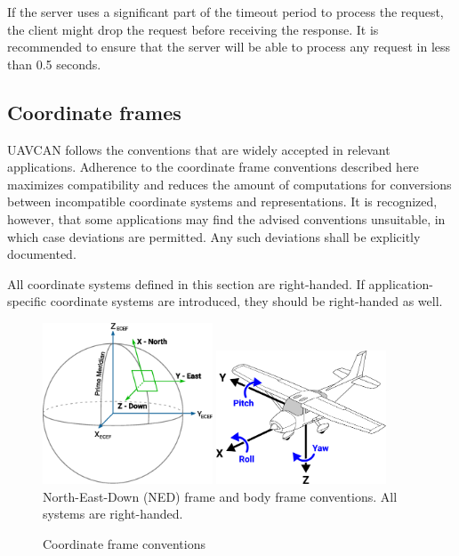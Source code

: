 If the server uses a significant part of the timeout period to process the request,
the client might drop the request before receiving the response.
It is recommended to ensure that the server will be able to process any request in less than 0.5 seconds.

\subsection{Coordinate frames}

UAVCAN follows the conventions that are widely accepted in relevant applications.
Adherence to the coordinate frame conventions described here maximizes compatibility and
reduces the amount of computations for conversions between incompatible coordinate systems and
representations.
It is recognized, however, that some applications may find the advised conventions unsuitable,
in which case deviations are permitted.
Any such deviations shall be explicitly documented.

All coordinate systems defined in this section are right-handed.
If application-specific coordinate systems are introduced, they should be right-handed as well.

\begin{figure}[hbt]
    \centering
	\includegraphics[width=0.45\textwidth]{application/NED_ECEF}
    \includegraphics[width=0.45\textwidth]{application/aircraft_principal_axes}
    North-East-Down (NED) frame and body frame conventions. All systems are right-handed.
    \caption{Coordinate frame conventions\label{fig:application_conventions_coordinate_frame}}
\end{figure}

